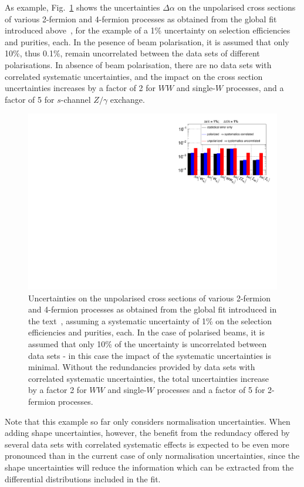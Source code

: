 \begin{itemize}
As example, Fig.~\ref{fig:alpha_error_corr_uncorr} shows the uncertainties $\Delta \alpha $ on the unpolarised cross sections of various 2-fermion and 4-fermion processes as obtained from the global fit introduced above~\cite{bib:PhDRobert}, for the example of a 1\% uncertainty on selection efficiencies and purities, each. In the pesence of beam polarisation, it is assumed that only 10\%, thus 0.1\%, remain uncorrelated between the data sets of different polarisations. In absence of beam polarisation, there are no data sets with correlated systematic uncertainties, and the impact on the cross section uncertainties increases by a factor of 2 for $WW$ and single-$W$ processes, and a factor of 5 for $s$-channel $Z/\gamma$ exchange.
\begin{figure}
\centering
\includegraphics[width=0.95\linewidth]{./chapters/figures/ElectroWeakSysDependency_alpha_short.pdf}
		
\caption{Uncertainties on the unpolarised cross sections of various 2-fermion and 4-fermion processes as obtained from the global fit introduced in the text~\cite{bib:PhDRobert}, assuming a systematic uncertainty of 1\% on the selection efficiencies and purities, each. In the case of polarised beams, it is assumed that only 10\% of the uncertainty is uncorrelated between data sets - in this case the impact of the systematic uncertainties is minimal. Without the redundancies provided by data sets with correlated systematic uncertainties, the total uncertainties increase by a factor 2 for $WW$ and single-$W$ processes and a factor of 5 for 2-fermion processes.}
\label{fig:alpha_error_corr_uncorr}
\end{figure}

Note that this example so far only considers normalisation uncertainties. When adding shape uncertainties, however, the benefit from the redundacy offered by several data sets with correlated systematic effects is expected to be even more pronounced than in the current case of only normalisation uncertainties, since the shape uncertainties will reduce the information which can be extracted from the  differential distributions included in the fit.  


\end{itemize}
